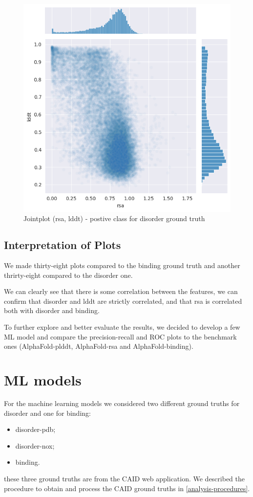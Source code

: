 \begin{figure}[h!]
    \includegraphics[width=\linewidth]{res/analysis/plots/dis1-jointplot_rsa-lddt.png}
    \caption{Jointplot (rsa, lddt) - postive class for disorder ground truth}
\end{figure}


\subsection{Interpretation of Plots}
We made thirty-eight plots compared to the binding ground truth and another thrirty-eight compared to the disorder one. 

We can clearly see that there is some correlation between the features, we can confirm that disorder and lddt are strictly correlated, and that rsa is correlated both with disorder and binding. 

To further explore and better evaluate the results, we decided to develop a few ML model and compare the precision-recall and ROC plots to the benchmark ones (AlphaFold-plddt, AlphaFold-rsa and AlphaFold-binding).

\section{ML models}
For the machine learning models we considered two different ground truths for disorder and one for binding:
\begin{itemize}
    \item disorder-pdb;
    \item disorder-nox;
    \item binding.
\end{itemize}
these three ground truths are from the CAID web application. We described the procedure to obtain and process the CAID ground truths in \ref{analysis-procedures}.


